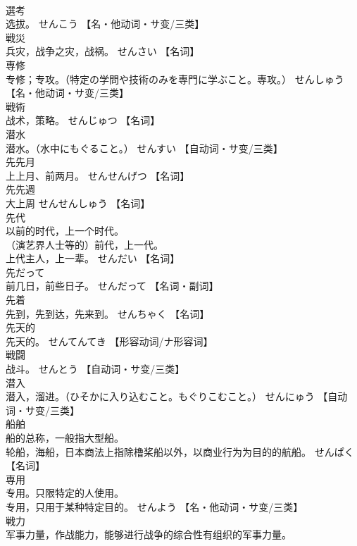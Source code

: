 \documentclass[8pt]{extreport}
\begin{document}
\begin{CJK}{UTF8}{min}
\\	選考	
\\	选拔。	せんこう		【名・他动词・サ变/三类】
\\	戦災	
\\	兵灾，战争之灾，战祸。	せんさい		【名词】
\\	専修	
\\	专修；专攻。（特定の学問や技術のみを専門に学ぶこと。専攻。）	せんしゅう		【名・他动词・サ变/三类】
\\	戦術	
\\	战术，策略。	せんじゅつ		【名词】
\\	潜水	
\\	潜水。（水中にもぐること。）	せんすい		【自动词・サ变/三类】
\\	先先月	
\\	上上月、前两月。	せんせんげつ		【名词】
\\	先先週	
\\	大上周	せんせんしゅう		【名词】
\\	先代	
\\	以前的时代，上一个时代。 
\\	（演艺界人士等的）前代，上一代。 
\\	上代主人，上一辈。	せんだい		【名词】
\\	先だって	
\\	前几日，前些日子。	せんだって		【名词・副词】
\\	先着	
\\	先到，先到达，先来到。	せんちゃく		【名词】
\\	先天的	
\\	先天的。	せんてんてき		【形容动词/ナ形容词】
\\	戦闘	
\\	战斗。	せんとう		【自动词・サ变/三类】
\\	潜入	
\\	潜入，溜进。（ひそかに入り込むこと。もぐりこむこと。）	せんにゅう		【自动词・サ变/三类】
\\	船舶	
\\	船的总称，一般指大型船。 
\\	轮船，海船，日本商法上指除橹桨船以外，以商业行为为目的的航船。	せんぱく		【名词】
\\	専用	
\\	专用。只限特定的人使用。 
\\	专用，只用于某种特定目的。	せんよう		【名・他动词・サ变/三类】
\\	戦力	
\\	军事力量，作战能力，能够进行战争的综合性有组织的军事力量。 

\end{CJK}
\end{document}
